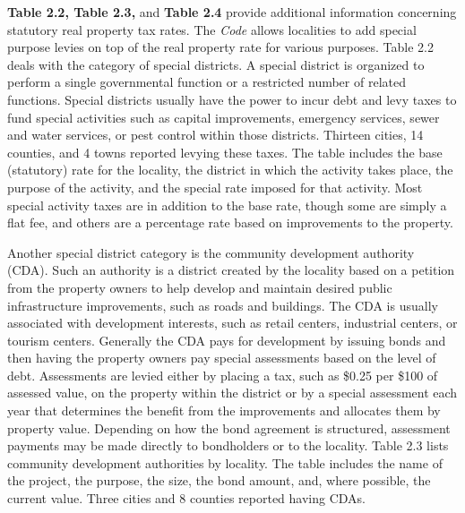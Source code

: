 \documentclass[
]{book}
\begin{document}
\textbf{Table 2.2, Table 2.3,} and \textbf{Table 2.4} provide additional information concerning statutory real property tax rates. The \emph{Code} allows localities to add special purpose levies on top of the real property rate for various purposes. Table 2.2 deals with the category of special districts. A special district is organized to perform a single governmental function or a restricted number of related functions. Special districts usually have the power to incur debt and levy taxes to fund special activities such as capital improvements, emergency services, sewer and water services, or pest control within those districts. Thirteen cities, 14 counties, and 4 towns reported levying these taxes. The table includes the base (statutory) rate for the locality, the district in which the activity takes place, the purpose of the activity, and the special rate imposed for that activity. Most special activity taxes are in addition to the base rate, though some are simply a flat fee, and others are a percentage rate based on improvements to the property.

Another special district category is the community development authority (CDA). Such an authority is a district created by the locality based on a petition from the property owners to help develop and maintain desired public infrastructure improvements, such as roads and buildings. The CDA is usually associated with development interests, such as retail centers, industrial centers, or tourism centers. Generally the CDA pays for development by issuing bonds and then having the property owners pay special assessments based on the level of debt. Assessments are levied either by placing a tax, such as \$0.25 per \$100 of assessed value, on the property within the district or by a special assessment each year that determines the benefit from the improvements and allocates them by property value. Depending on how the bond agreement is structured, assessment payments may be made directly to bondholders or to the locality. Table 2.3 lists community development authorities by locality. The table includes the name of the project, the purpose, the size, the bond amount, and, where possible, the current value. Three cities and 8 counties reported having CDAs.
\end{document}
